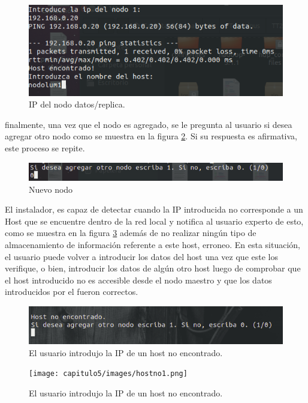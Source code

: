 \begin{figure}[H]
	\begin{center}	
		\includegraphics[width=.7\textwidth]{capitulo5/images/ipnodo.png}
		\caption{IP del nodo datos/replica.}
		\label{fig:esclavo}
	\end{center}
\end{figure}
finalmente, una vez que el nodo es agregado, se le pregunta al usuario si desea agregar otro nodo como se muestra en la figura \ref{fig:nuevonodo}. Si su respuesta es afirmativa, este proceso se repite. 
\begin{figure}[H]
	\begin{center}	
		\includegraphics[width=.65\textwidth]{capitulo5/images/copiadohosts.png}
		\caption{Nuevo nodo}
		\label{fig:nuevonodo}
	\end{center}
\end{figure}
El instalador, es capaz de detectar cuando la IP introducida no corresponde a un Host que se encuentre dentro de la red local y notifica al usuario experto de esto, como se muestra en la figura \ref{fig:hostnoencontrado} además de no realizar ningún tipo de almacenamiento de información referente a este host, erroneo.
En esta situación, el usuario puede volver a introducir los datos del host una vez que este los verifique, o bien, introducir los datos de algún otro host luego de comprobar que el host introducido no es accesible desde el nodo maestro y que los datos introducidos por el fueron correctos.
\\
\begin{figure}[H]
	\hypertarget{fig:hostnoencontrado}{\hspace{1pt}}
	\begin{center}	
		\includegraphics[width=.3\textwidth]{capitulo5/images/hostno.png}
		\caption{El usuario introdujo la IP de un host no encontrado.}
		\label{fig:hostnoencontrado}
	\end{center}
\end{figure}
\begin{figure}[H]
	\hypertarget{fig:hostnoencontrado2}{\hspace{1pt}}
	\begin{center}	
		\texttt{[image: capitulo5/images/hostno1.png]}
		\caption{El usuario introdujo la IP de un host no encontrado.}
		\label{fig:hostnoencontrado2}
	\end{center}
\end{figure}
